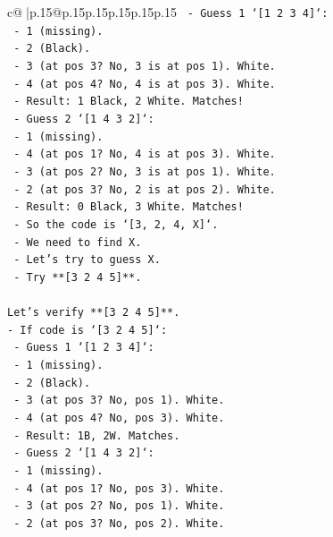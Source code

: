 \documentclass{article}
\begin{document}
{\begin{supertabular}{c@{$\;$}|p{.15\linewidth}@{}p{.15\linewidth}p{.15\linewidth}p{.15\linewidth}p{.15\linewidth}p{.15\linewidth}}
{{{\texttt{        {-} Guess 1 `{[}1 2 3 4{]}`:} \\
\texttt{          {-} 1 (missing).} \\
\texttt{          {-} 2 (Black).} \\
\texttt{          {-} 3 (at pos 3? No, 3 is at pos 1). White.} \\
\texttt{          {-} 4 (at pos 4? No, 4 is at pos 3). White.} \\
\texttt{          {-} Result: 1 Black, 2 White. Matches!} \\
\texttt{        {-} Guess 2 `{[}1 4 3 2{]}`:} \\
\texttt{          {-} 1 (missing).} \\
\texttt{          {-} 4 (at pos 1? No, 4 is at pos 3). White.} \\
\texttt{          {-} 3 (at pos 2? No, 3 is at pos 1). White.} \\
\texttt{          {-} 2 (at pos 3? No, 2 is at pos 2). White.} \\
\texttt{          {-} Result: 0 Black, 3 White. Matches!} \\
\texttt{        {-} So the code is `{[}3, 2, 4, X{]}`.} \\
\texttt{        {-} We need to find X.} \\
\texttt{        {-} Let's try to guess X.} \\
\texttt{        {-} Try **{[}3 2 4 5{]}**.} \\
\\ 
\texttt{Let's verify **{[}3 2 4 5{]}**.} \\
\texttt{{-} If code is `{[}3 2 4 5{]}`:} \\
\texttt{  {-} Guess 1 `{[}1 2 3 4{]}`:} \\
\texttt{    {-} 1 (missing).} \\
\texttt{    {-} 2 (Black).} \\
\texttt{    {-} 3 (at pos 3? No, pos 1). White.} \\
\texttt{    {-} 4 (at pos 4? No, pos 3). White.} \\
\texttt{    {-} Result: 1B, 2W. Matches.} \\
\texttt{  {-} Guess 2 `{[}1 4 3 2{]}`:} \\
\texttt{    {-} 1 (missing).} \\
\texttt{    {-} 4 (at pos 1? No, pos 3). White.} \\
\texttt{    {-} 3 (at pos 2? No, pos 1). White.} \\
\texttt{    {-} 2 (at pos 3? No, pos 2). White.} \\
}}}
\end{supertabular}}
\end{document}

